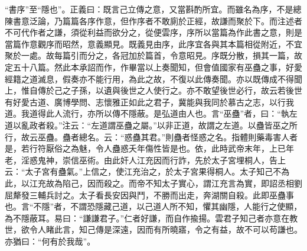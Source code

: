 {\noindent\shu{}\fzkt “書序”至“隱也”。正義曰：既言己立傳之意，又當斟酌所宜。而雖名為序，不是總陳書意泛論，乃篇篇各序作意，但作序者不敢廁於正經，故謙而聚於下。而注述者不可代作者之謙，須從利益而欲分之，從便雲序，序所以當篇為作此書之意，則是當篇作意觀序而昭然，意義顯見。既義見由序，此序宜各與其本篇相從附近，不宜聚於一處。故每篇引而分之，各冠加於篇首，令意昭見。序既分散，損其一篇，故定五十八篇。然此本承詔而作，作畢當以上奏聞知，但會值國家有巫蠱之事，好愛經籍之道滅息，假奏亦不能行用，為此之故，不復以此傳奏聞。亦以既傳成不得聞上，惟自傳於己之子孫，以遺與後世之人使行之。亦不敢望後世必行，故云若後世有好愛古道、廣博學問、志懷雅正如此之君子，冀能與我同於慕古之志，以行我道。我道得此人流行，亦所以傳不隱蔽。是弘道由人也。言“巫蠱”者，曰：“執左道以亂政者殺。”注云：“左道謂巫蠱之屬。”以非正道，故謂之左道。以蠱皆巫之所行，故云巫蠱。蠱者總名。云：“惑蠱其君。”則蠱者怪惑之名。指體則藥毒害人者是，若行符厭俗之為魅，令人蠱惑夭年傷性皆是也。依，此時武帝末年，上已年老，淫惑鬼神，崇信巫術。由此奸人江充因而行詐，先於太子宮埋桐人，告上云：“太子宮有蠱氣。”上信之，使江充治之，於太子宮果得桐人。太子知己不為此，以江充故為陷己，因而殺之。而帝不知太子實心，謂江充言為實，即詔丞相劉屈犛發三輔兵討之。太子看長安因與鬥，不勝而出走，奔湖關自殺。此即巫蠱事也。言“不隱”者，不謂恐隱藏己道，以己道人所不知，懼其幽隱，人能行之使顯，為不隱蔽耳。易曰：“謙謙君子。”仁者好謙，而自作揄揚。雲君子知己者亦意在教世，欲令人睹此言，知己傳是深遠，因而有所曉寤，令之有益，故不可以苟謙也。亦猶曰：“何有於我哉”。 \par}

